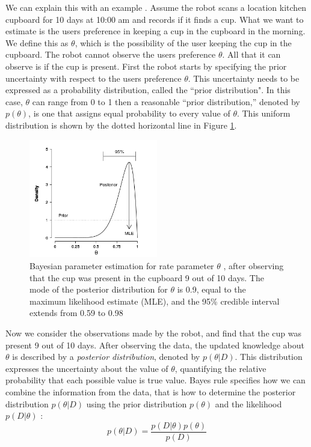 We can explain this with an example \cite{lee2014bayesian}. Assume the robot scans a location kitchen cupboard for 10 days at 10:00 am and records if it finds a cup. What we want to estimate is the users preference in keeping a cup in the cupboard in the morning. We define this as $\theta$, which is the possibility of the user keeping the cup in the cupboard. The robot cannot observe the users preference $\theta$. All that it can observe is if the cup is present. First the robot starts by specifying the prior uncertainty with respect to the users preference $\theta$. This uncertainty needs to be expressed as a probability distribution, called the ``prior distribution". In this case,  $\theta$ can range from 0 to 1 then a reasonable ``prior distribution,” denoted by $p (\theta)$, is one that assigns equal probability to every value of $\theta$. This uniform distribution is shown by the dotted horizontal line in Figure \ref{fig: bayes}.


\begin{figure}[htp]
\centering

\includegraphics[width=0.5\textwidth]{images/bayes.png}
\caption[Bayesian parameter estimation]{Bayesian parameter estimation for rate parameter $\theta$
, after observing that the cup was present in the cupboard 9 out of 10 days. The mode of the posterior distribution for $\theta$ is 0.9, equal to the maximum likelihood estimate  (MLE), and the 95\% credible interval extends from 0.59 to 0.98 \citep{lee2014bayesian}}
\label{fig: bayes}
\end{figure}

Now we consider the observations made by the robot, and find that the cup was present 9 out of 10 days. After observing the data, the updated knowledge about $\theta$ is described by a \emph{posterior distribution}, denoted by $p (\theta | D)$. This distribution expresses the uncertainty about the value of $\theta$, quantifying the relative probability that each possible value is true value. Bayes rule specifies how we can combine the information from the data, that is how to determine the posterior distribution $p  (\theta | D)$ using  the prior distribution $p (\theta)$ and the likelihood  $p  (D | \theta)$ :
\begin{equation}
	p (\theta | D) = \frac{p (D | \theta) p (\theta)}{p (D)}
\end{equation}

